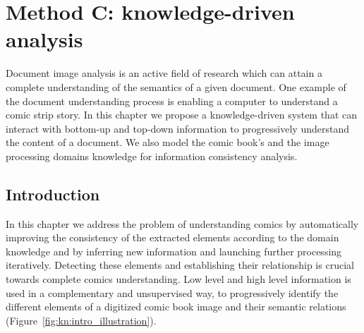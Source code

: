 \chapter{Method C: knowledge-driven analysis}
\label{chap:knowledge}
\graphicspath{{./chapters/5-knowledge/figs/}}

Document image analysis is an active field of research which can attain a complete understanding of the semantics of a given document.
One example of the document understanding process is enabling a computer to understand a comic strip story.
In this chapter we propose a knowledge-driven system that can interact with bottom-up and top-down information to progressively understand the content of a document.
We also model the comic book's and the image processing domains knowledge for information consistency analysis.

\section{Introduction}
\label{sec:kn:introduction}


In this chapter we address the problem of understanding comics by automatically improving the consistency of the extracted elements according to the domain knowledge and by inferring new information and launching further processing iteratively.
Detecting these elements and establishing their relationship is crucial towards complete comics understanding.
Low level and high level information is used in a complementary and unsupervised way, to progressively identify the different elements of a digitized comic book image and their semantic relations (Figure~\ref{fig:kn:intro_illustration}).

